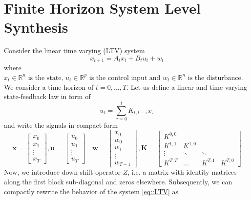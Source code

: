 \documentclass{article}[12pt]
\begin{document}
\section{Finite Horizon System Level Synthesis}
Consider the linear time varying (LTV) system
\begin{equation}
    \label{eq::LTV}
    x_{t+1}=A_{t} x_{t}+B_{t} u_{t}+w_{t}
\end{equation}
where $x_{t} \in \mathbb{R}^{n} \text { is the state, } u_{t} \in \mathbb{R}^{p} \text { is the control input and } w_{t} \in \mathbb{R}^{n} \text { is the disturbance}$. We consider a time horizon of $t=0, \ldots, T$.
Let us define a linear and time-varying state-feedback law in form of
\begin{equation}
    \label{eq::control_law}
    u_{t}=\sum_{\tau=0}^{t} K_{t, t-\tau} x_{\tau}
\end{equation}
and write the signals in compact form
\begin{equation}
\label{eq::BLT}
    \mathbf{x}=\left[\begin{array}{c}{x_{0}} \\ {x_{1}} \\ {\vdots} \\ {x_{T}}\end{array}\right], \mathbf{u}=\left[\begin{array}{c}{u_{0}} \\ {u_{1}} \\ {\vdots} \\ {u_{T}}\end{array}\right] \quad \mathbf{w}=\left[\begin{array}{c}{x_{0}} \\ {w_{0}} \\ {w_{1}} \\ {\vdots} \\ {w_{T-1}}\end{array}\right], \mathbf{K}=\left[\begin{array}{cccc}{K^{0,0}} & {} & {} & {} \\ {K^{1,1}} & {K^{1,0}} & {} & {} \\ {\vdots} & {\ddots} & {\ddots} & {} \\ {K^{T, T}} & {\ldots} & {K^{T, 1}} & {K^{T, 0}}\end{array}\right]
\end{equation}
Now, we introduce down-shift operator $Z$, i.e. a matrix with identity matrices along the first block sub-diagonal and zeros elsewhere. Subsequently, we can compactly rewrite the behavior of the system \eqref{eq::LTV} as
\end{document}
